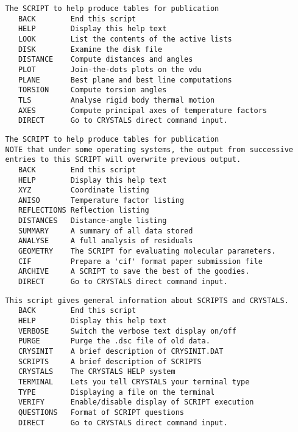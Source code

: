 \documentclass[10pt,a4paper]{report}
\begin{document}
\bigskip{}


\small\begin{verbatim}
   The SCRIPT to help produce tables for publication
      BACK        End this script
      HELP        Display this help text
      LOOK        List the contents of the active lists
      DISK        Examine the disk file
      DISTANCE    Compute distances and angles
      PLOT        Join-the-dots plots on the vdu
      PLANE       Best plane and best line computations
      TORSION     Compute torsion angles
      TLS         Analyse rigid body thermal motion
      AXES        Compute principal axes of temperature factors
      DIRECT      Go to CRYSTALS direct command input.
\end{verbatim}\normalsize




\bigskip{}


\small\begin{verbatim}
   The SCRIPT to help produce tables for publication
   NOTE that under some operating systems, the output from successive
   entries to this SCRIPT will overwrite previous output.
      BACK        End this script
      HELP        Display this help text
      XYZ         Coordinate listing
      ANISO       Temperature factor listing
      REFLECTIONS Reflection listing
      DISTANCES   Distance-angle listing
      SUMMARY     A summary of all data stored
      ANALYSE     A full analysis of residuals
      GEOMETRY    The SCRIPT for evaluating molecular parameters.
      CIF         Prepare a 'cif' format paper submission file
      ARCHIVE     A SCRIPT to save the best of the goodies.
      DIRECT      Go to CRYSTALS direct command input.
\end{verbatim}\normalsize




\bigskip{}


\small\begin{verbatim}
   This script gives general information about SCRIPTS and CRYSTALS.
      BACK        End this script
      HELP        Display this help text
      VERBOSE     Switch the verbose text display on/off
      PURGE       Purge the .dsc file of old data.
      CRYSINIT    A brief description of CRYSINIT.DAT
      SCRIPTS     A brief description of SCRIPTS
      CRYSTALS    The CRYSTALS HELP system
      TERMINAL    Lets you tell CRYSTALS your terminal type
      TYPE        Displaying a file on the terminal
      VERIFY      Enable/disable display of SCRIPT execution
      QUESTIONS   Format of SCRIPT questions
      DIRECT      Go to CRYSTALS direct command input.
\end{verbatim}\normalsize
\end{document}
